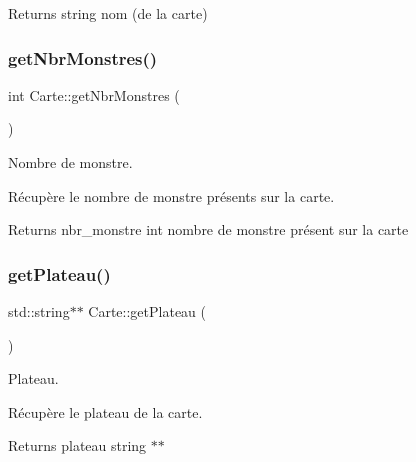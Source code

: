 \begin{DoxyReturn}{Returns}
string nom (de la carte) 
\end{DoxyReturn}
\mbox{\label{class_carte_abc46efd826637fba019f970df54919cc}} 
\subsubsection{\texorpdfstring{get\+Nbr\+Monstres()}{getNbrMonstres()}}
{\footnotesize\ttfamily int Carte\+::get\+Nbr\+Monstres (\begin{DoxyParamCaption}{ }\end{DoxyParamCaption})\hspace{0.3cm}{\ttfamily [inline]}}



Nombre de monstre. 

Récupère le nombre de monstre présents sur la carte.

\begin{DoxyReturn}{Returns}
nbr\+\_\+monstre int nombre de monstre présent sur la carte 
\end{DoxyReturn}
\mbox{\label{class_carte_a28937b5fe965b58289aee6ca0df3ca94}} 
\subsubsection{\texorpdfstring{get\+Plateau()}{getPlateau()}}
{\footnotesize\ttfamily std\+::string$\ast$$\ast$ Carte\+::get\+Plateau (\begin{DoxyParamCaption}{ }\end{DoxyParamCaption})\hspace{0.3cm}{\ttfamily [inline]}}



Plateau. 

Récupère le plateau de la carte.

\begin{DoxyReturn}{Returns}
plateau string $\ast$$\ast$ 
\end{DoxyReturn}
\mbox{\label{class_carte_a507502fe5beff8008e5608519086be12}} 
